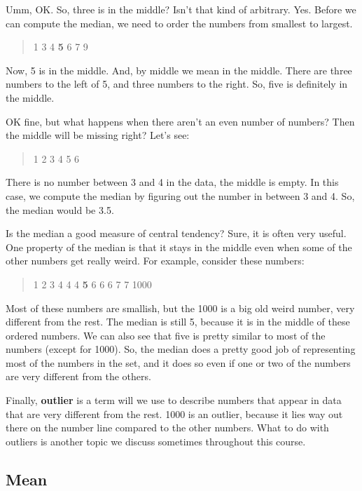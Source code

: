 \documentclass[]{book}
\begin{document}
Umm, OK. So, three is in the middle? Isn't that kind of arbitrary. Yes. Before we can compute the median, we need to order the numbers from smallest to largest.

\begin{quote}
1 3 4 \textbf{5} 6 7 9
\end{quote}

Now, 5 is in the middle. And, by middle we mean in the middle. There are three numbers to the left of 5, and three numbers to the right. So, five is definitely in the middle.

OK fine, but what happens when there aren't an even number of numbers? Then the middle will be missing right? Let's see:

\begin{quote}
1 2 3 4 5 6
\end{quote}

There is no number between 3 and 4 in the data, the middle is empty. In this case, we compute the median by figuring out the number in between 3 and 4. So, the median would be 3.5.

Is the median a good measure of central tendency? Sure, it is often very useful. One property of the median is that it stays in the middle even when some of the other numbers get really weird. For example, consider these numbers:

\begin{quote}
1 2 3 4 4 4 \textbf{5} 6 6 6 7 7 1000
\end{quote}

Most of these numbers are smallish, but the 1000 is a big old weird number, very different from the rest. The median is still 5, because it is in the middle of these ordered numbers. We can also see that five is pretty similar to most of the numbers (except for 1000). So, the median does a pretty good job of representing most of the numbers in the set, and it does so even if one or two of the numbers are very different from the others.

Finally, \textbf{outlier} is a term will we use to describe numbers that appear in data that are very different from the rest. 1000 is an outlier, because it lies way out there on the number line compared to the other numbers. What to do with outliers is another topic we discuss sometimes throughout this course.

\hypertarget{mean}{%
\subsection{Mean}\label{mean}}
\end{document}
